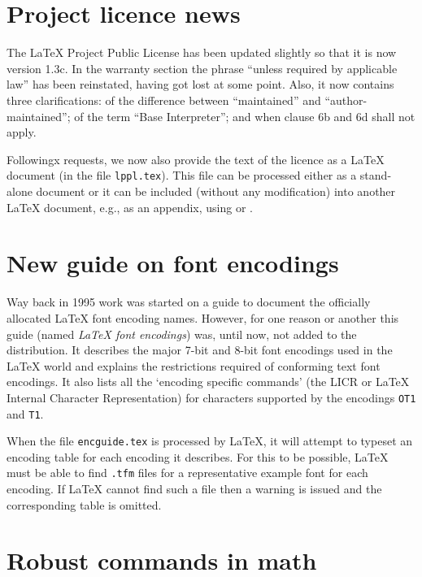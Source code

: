 \documentclass{ltnews}
\providecommand\file[1]{\texttt{#1}}
\begin{document}
\maketitle


\section{Project licence news}

The \LaTeX{} Project Public License has been updated slightly so that
it is now version 1.3c.  In the warranty section the
phrase ``unless required by applicable law'' has been reinstated,
having got lost at some point.  Also,
it now contains three clarifications: of the difference between
``maintained'' and ``author-maintained''; of the
term ``Base Interpreter''; and when clause 6b and 6d shall not apply.

Followingx requests, we now also provide the text of the licence as a
\LaTeX{} document (in the file \texttt{lppl.tex}). This file can be
processed either as a stand-alone document or it can be included
(without any modification) into another \LaTeX{} document, e.g., as an
appendix, using \verb|| or \verb||.


\section{New guide on font encodings}

Way back in 1995 work was started on a guide to document the
officially allocated \LaTeX{} font encoding names. However, for one
reason or another this guide (named \textit{\LaTeX{} font encodings})
was, until now, not added to the distribution.  It describes the major
7-bit and 8-bit font encodings used in the \LaTeX{} world and explains
the restrictions required of conforming text font encodings.  It also
lists all the `encoding specific commands' (the LICR or \LaTeX{}
Internal Character Representation) for characters supported by the
encodings \texttt{OT1} and \texttt{T1}.

When the file \file{encguide.tex} is processed by \LaTeX{}, it will
attempt to typeset an encoding table for each encoding it describes.
For this to be possible, \LaTeX{} must be able to find \texttt{.tfm}
files for a representative example font for each encoding.  If
\LaTeX{} cannot find such a file then a warning is issued and the
corresponding table is omitted.


\section{Robust commands in math}
\end{document}
